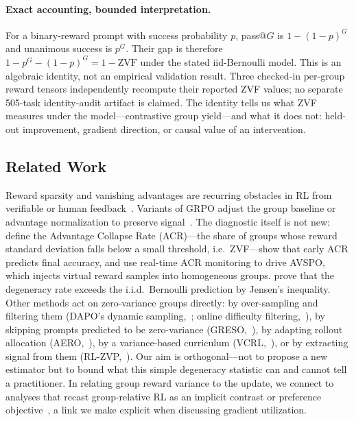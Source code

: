 \paragraph{Exact accounting, bounded interpretation.}
For a binary-reward prompt with success probability $p$, pass@$G$ is
$1-(1-p)^G$ and unanimous success is $p^G$. Their gap is therefore
$1-p^G-(1-p)^G=1-\mathrm{ZVF}$ under the stated iid-Bernoulli model. This is an
algebraic identity, not an empirical validation result. Three checked-in
per-group reward tensors independently recompute their reported ZVF values; no
separate 505-task identity-audit artifact is claimed. The identity tells us what
ZVF measures under the model---contrastive group yield---and what it does not:
held-out improvement, gradient direction, or causal value of an intervention.

\subsection{Related Work}
\label{sec:p2-related}
Reward sparsity and vanishing advantages are recurring obstacles in RL from
verifiable or human feedback~\citep{christiano2017deeprlhf, ouyang2022training, ahmadian2024backtobasics}. Variants of GRPO adjust the group baseline or advantage
normalization to preserve signal~\citep{lin2025cppo, gift2025, tong2025drgrpo}.
The diagnostic itself is not new: \citet{he2026advantage} define the Advantage
Collapse Rate (ACR)---the share of groups whose reward standard deviation falls
below a small threshold, i.e.\ ZVF---show that early ACR predicts final accuracy,
and use real-time ACR monitoring to drive AVSPO, which injects virtual reward
samples into homogeneous groups. \citet{nie2026gradstarvation} prove that the
degeneracy rate exceeds the i.i.d.\ Bernoulli prediction by Jensen's inequality.
Other methods act on zero-variance groups directly: by over-sampling and
filtering them (DAPO's dynamic sampling,~\citealp{yu2025dapo}; online difficulty
filtering,~\citealp{bae2025online}), by skipping prompts predicted to be
zero-variance (GRESO,~\citealp{zhang2026greso}), by adapting rollout allocation
(AERO,~\citealp{zhang2026aero}), by a variance-based curriculum
(VCRL,~\citealp{jiang2025vcrl}), or by extracting signal from them
(RL-ZVP,~\citealp{le2025rlzvp}).
Our aim is orthogonal---not to propose a new estimator but to bound what this
simple degeneracy statistic can and cannot tell a practitioner. In relating group reward variance
to the update, we connect to analyses that recast group-relative RL as an implicit
contrast or preference objective~\citep{wu2025grpodpo}, a link we make
explicit when discussing gradient utilization.
